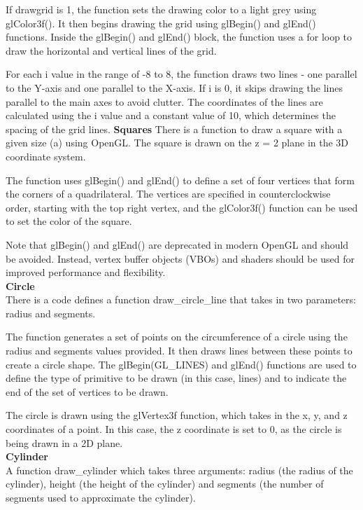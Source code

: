 \documentclass[12pt,a4]{article}
\begin{document}
{If drawgrid is 1, the function sets the drawing color to a light grey using glColor3f(). It then begins drawing the grid using glBegin() and glEnd() functions. Inside the glBegin() and glEnd() block, the function uses a for loop to draw the horizontal and vertical lines of the grid.

For each i value in the range of -8 to 8, the function draws two lines - one parallel to the Y-axis and one parallel to the X-axis. If i is 0, it skips drawing the lines parallel to the main axes to avoid clutter. The coordinates of the lines are calculated using the i value and a constant value of 10, which determines the spacing of the grid lines.
\newpage
\textbf{\Large{Squares}}
There is a function to draw a square with a given size (a) using OpenGL. The square is drawn on the z = 2 plane in the 3D coordinate system.

The function uses glBegin() and glEnd() to define a set of four vertices that form the corners of a quadrilateral. The vertices are specified in counterclockwise order, starting with the top right vertex, and the glColor3f() function can be used to set the color of the square.

Note that glBegin() and glEnd() are deprecated in modern OpenGL and should be avoided. Instead, vertex buffer objects (VBOs) and shaders should be used for improved performance and flexibility.\\

\textbf{\Large{Circle}}\\
There is a  code defines a function draw\_circle\_line that takes in two parameters: radius and segments.

The function generates a set of points on the circumference of a circle using the radius and segments values provided. It then draws lines between these points to create a circle shape. The glBegin(GL\_LINES) and glEnd() functions are used to define the type of primitive to be drawn (in this case, lines) and to indicate the end of the set of vertices to be drawn.

The circle is drawn using the glVertex3f function, which takes in the x, y, and z coordinates of a point. In this case, the z coordinate is set to 0, as the circle is being drawn in a 2D plane.\\


\textbf{\Large{Cylinder}}\\
 A function draw\_cylinder which takes three arguments: radius (the radius of the cylinder), height (the height of the cylinder) and segments (the number of segments used to approximate the cylinder).

}
\end{document}
